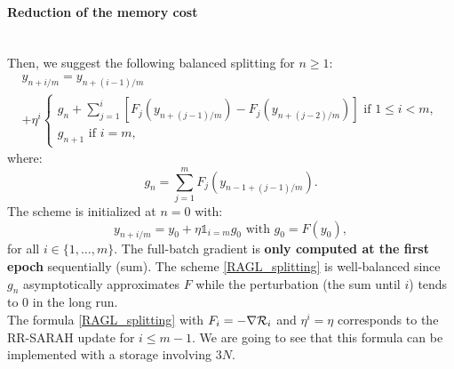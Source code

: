 \paragraph{Reduction of the memory cost}
~~\\
Then, we suggest the following balanced splitting for $n\geq 1$:
\begin{multline}
	y_{n+i/m} = y_{n+(i-1)/m} \\
	+\eta^i
	\left\{
	\begin{array}{ll}
		g_n+\displaystyle{\sum_{j=1}^i} \left[F_j\left(y_{n+(j-1)/m}\right)-F_j\left(y_{n+(j-2)/m}\right)\right] \text{ if } 1\leq i<m,\\
		g_{n+1} \text{ if } i=m,
	\end{array}
	\right.
	\label{RAGL_splitting}
\end{multline}
where:
\begin{equation*}
	g_n = \sum_{j=1}^m F_j\left(y_{n-1+(j-1)/m}\right).
\end{equation*}
The scheme is initialized at $n=0$ with:
\begin{equation*}
	y_{n+i/m} = y_0 + \eta \mathds{1}_{i=m} g_0 \text{ with } g_0 = F(y_0),
\end{equation*}
for all $i \in \{1,\dots,m\}$. The full-batch gradient is \textbf{only computed at the first epoch} sequentially (sum). The scheme \eqref{RAGL_splitting} is well-balanced	since $g_n$ asymptotically approximates $F$ while the perturbation (the sum until $i$) tends to 0 in the long run. \\
The formula \eqref{RAGL_splitting} with $F_i=-\nabla \mathcal{R}_i$ and $\eta^i=\eta$ corresponds to the RR-SARAH \cite{RR_SARAH} update for $i\leq m-1$. We are going to see that this formula can be implemented with a storage involving $3N$.

